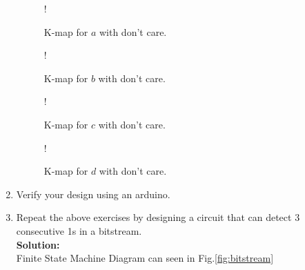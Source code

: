 \documentclass[journal,12pt,twocolumn]{IEEEtran}
\begin{document}
\begin{enumerate}[1.]
\begin{figure}[!h]
	\resizebox {\columnwidth} {!} {
		
	}
	\caption{K-map for $a$ with don't care.}
	\label{fig:kmap_ax}
\end{figure}
\begin{figure}[!h]
	\resizebox {\columnwidth} {!} {
		
	}
	\caption{K-map for $b$ with don't care.}
	\label{fig:kmap_bx}
\end{figure}
\begin{figure}[!h]
	\resizebox {\columnwidth} {!} {
		
	}
	\caption{K-map for $c$ with don't care.}
	\label{fig:kmap_cx}
\end{figure}
\begin{figure}[!h]
	\resizebox {\columnwidth} {!} {
		
	}
	\caption{K-map for $d$ with don't care.}
	\label{fig:kmap_dx}
\end{figure}
\item Verify your design using an arduino.
\item Repeat the above exercises by designing a circuit that can detect 3 consecutive 1s in a bitstream. \\
\textbf{Solution:}\\
Finite State Machine Diagram can seen in Fig.\ref{fig:bitstream} \\


\end{enumerate}
\end{document}
